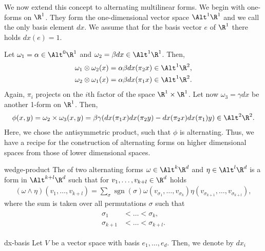 \begin{intro}
  We now extend this concept to alternating multilinear forms. We
  begin with one-forms on $\R^1$. They form the one-dimensional vector
  space $\Alt^1\R^1$ and we call the only basis element $dx$. We
  assume that for the basis vector $e$ of $\R^1$ there holds $dx(e) = 1$.

  Let $\omega_1 = \alpha \in \Alt^0\R^1$ and
  $\omega_2 = \beta dx \in\Alt^1\R^1$. Then,
  \begin{gather}
    \begin{split}
          \omega_1\otimes\omega_2 (x) &= \alpha\beta dx(\pi_2x) \in\Alt^1\R^2,
          \\
          \omega_2\otimes\omega_1 (x) &= \alpha\beta dx(\pi_1x) \in\Alt^1\R^2.
    \end{split}
  \end{gather}
  Again, $\pi_i$ projects on the $i$th factor of the space
  $\R^1\times \R^1$. Let now $\omega_3 = \gamma dx$ be another 1-form
  on $\R^1$. Then,
  \begin{gather}
    \phi(x,y) = \omega_2\times \omega_3(x,y) = \beta\gamma (dx(\pi_1 x)
    dx(\pi_2 y) - dx(\pi_2 x) dx(\pi_1)y) \in \Alt^2\R^2.
  \end{gather}
  Here, we chose the antisymmetric product, such that $\phi$ is
  alternating. Thus, we have a recipe for the construction of
  alternating forms on higher dimensional spaces from those of lower
  dimensional spaces.
\end{intro}


\begin{Definition}{wedge-product}
  The  of two alternating forms
  $\omega\in \Alt^k\R^d$ and $\eta\in\Alt^l\R^d$ is a form in $\Alt^{k+l}\R^d$ such that for
  $v_1,\dots,v_{k+l}\in\R^d$ holds
  \begin{gather}
    (\omega\wedge\eta)(v_1,\dots,v_{k+l})
    = \sum_{\sigma} \operatorname{sgn}(\sigma) \omega(v_{\sigma_1},\dots,v_{\sigma_k})
    \eta(v_{\sigma_{k+1}},\dots,v_{\sigma_{k+l}}),
  \end{gather}
  where the sum is taken over all permutations $\sigma$ such that
  \begin{gather}
    \begin{split}
      \sigma_1 &< \dots < \sigma_k,\\
      \sigma_{k+1} & < \dots < \sigma_{k+l}.
    \end{split}
  \end{gather}
\end{Definition}

\begin{Notation}{dx-basis}
  Let $V$ be a vector space with basis $e_1,\dots,e_d$. Then, we denote by $dx_i$
\end{Notation}
